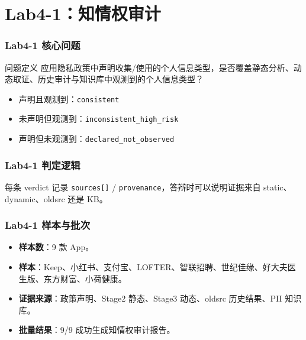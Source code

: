 \documentclass[AutoFakeBold,AutoFakeSlant]{beamer}
\newcommand{\code}[1]{\texttt{#1}}
\begin{document}
\section{Lab4-1：知情权审计}

\begin{frame}
    \frametitle{Lab4-1 核心问题}
    \small
    \begin{block}{问题定义}
        应用隐私政策中声明收集/使用的个人信息类型，是否覆盖静态分析、动态取证、历史审计与知识库中观测到的个人信息类型？
    \end{block}
    \begin{itemize}
        \item 声明且观测到：\code{consistent}
        \item 未声明但观测到：\code{inconsistent\_high\_risk}
        \item 声明但未观测到：\code{declared\_not\_observed}
    \end{itemize}
\end{frame}

\begin{frame}
    \frametitle{Lab4-1 判定逻辑}
    \centering
    \vspace{0.6em}

    \scriptsize
    每条 verdict 记录 \code{sources[]} / \code{provenance}，答辩时可以说明证据来自 static、dynamic、oldsrc 还是 KB。
\end{frame}

\begin{frame}
    \frametitle{Lab4-1 样本与批次}
    \small
    \begin{itemize}
        \item \textbf{样本数}：9 款 App。
        \item \textbf{样本}：Keep、小红书、支付宝、LOFTER、智联招聘、世纪佳缘、好大夫医生版、东方财富、小荷健康。
        \item \textbf{证据来源}：政策声明、Stage2 静态、Stage3 动态、oldsrc 历史结果、PII 知识库。
        \item \textbf{批量结果}：9/9 成功生成知情权审计报告。
    \end{itemize}
\end{frame}
\end{document}
